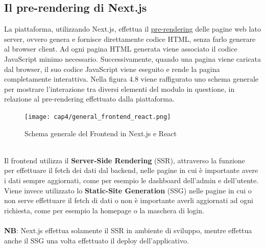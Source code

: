 \subsection{Il pre-rendering di Next.js}
La piattaforma, utilizzando Next.js, effettua il \hyperref[sec:site-rendering]{pre-rendering} delle pagine web lato server, ovvero genera e fornisce direttamente codice HTML, senza farlo generare al browser client. Ad ogni pagina HTML generata viene associato il codice JavaScript minimo necessario. Successivamente, quando una pagina viene caricata dal browser, il suo codice JavaScript viene eseguito e rende la pagina completamente interattiva. Nella figura 4.8 viene raffigurato uno schema generale per mostrare l'interazione tra diversi elementi del modulo in questione, in relazione al pre-rendering effettuato dalla piattaforma.
\begin{figure}[!h] 
    \centering 
    \texttt{[image: cap4/general\_frontend\_react.png]} 
    \caption{Schema generale del Frontend in Next.js e React}
\end{figure} \\
Il \gls{frontend} utilizza il \textbf{Server-Side Rendering} (SSR), attraverso la funzione \\  per effettuare il fetch dei dati dal \gls{backend}, nelle pagine in cui è importante avere i dati sempre aggiornati, come per esempio le dashboard dell'admin e dell'utente. \\
Viene invece utilizzato lo \textbf{Static-Site Generation} (SSG) nelle pagine in cui o non serve effettuare il fetch di dati o non è importante averli aggiornati ad ogni richiesta, come per esempio la homepage o la maschera di login. \\ \\
\textbf{NB}: Next.js effettua solamente il SSR in ambiente di sviluppo, mentre effettua anche il SSG una volta effettuato il deploy dell'applicativo.

